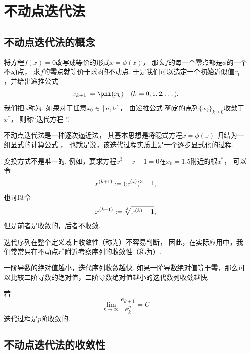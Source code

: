 \section{不动点迭代法}
\subsection{不动点迭代法的概念}
将方程\(f(x) = 0\)改写成等价的形式\(
	x = \phi(x)
\)，
那么\(f\)的每一个零点都是\(\phi\)的一个不动点，
求\(f\)的零点就等价于求\(\phi\)的不动点.
于是我们可以选定一个初始近似值\(x_0\)，并给出递推公式\begin{equation}\label{definition:不动点迭代法.递推公式}
	x_{k+1} \defeq \phi(x_k)
	\quad(k=0,1,2,\dotsc).
\end{equation}
我们把\(\phi\)称为.
如果对于任意\(x_0 \in [a,b]\)，
由递推公式  确定的点列\(\{x_k\}_{k\geq0}\)收敛于\(x^*\)，
则称“迭代方程  ”.

不动点迭代法是一种逐次逼近法，
其基本思想是将隐式方程\(x = \phi(x)\)
归结为一组显式的计算公式 ，
也就是说，该迭代过程实质上是一个逐步显式化的过程.

变换方式不是唯一的.
例如，要求方程\(x^3 - x - 1 = 0\)在\(x_0 = 1.5\)附近的根\(x^*\)，
可以令\begin{equation*}
	x^{(k+1)} := (x^{(k)})^3 - 1,
\end{equation*}
也可以令\begin{equation*}
	x^{(k+1)} := \sqrt[3]{x^{(k)} + 1 },
\end{equation*}
但是前者是收敛的，后者不收敛.



迭代序列在整个定义域上收敛性（称为）不容易判断，
因此，在实际应用中，我们常常只在不动点\(x^*\)附近考察序列的收敛性（称为）.


一阶导数的绝对值越小，迭代序列收敛越快.
如果一阶导数绝对值等于零，那么可以比较二阶导数的绝对值，二阶导数绝对值越小的迭代数列收敛越快.

若\begin{equation*}
	\lim_{k\to\infty} \frac{e_{k+1}}{e_k^p} = C
\end{equation*}
迭代过程是\(p\)阶收敛的.

\subsection{不动点迭代法的收敛性}

